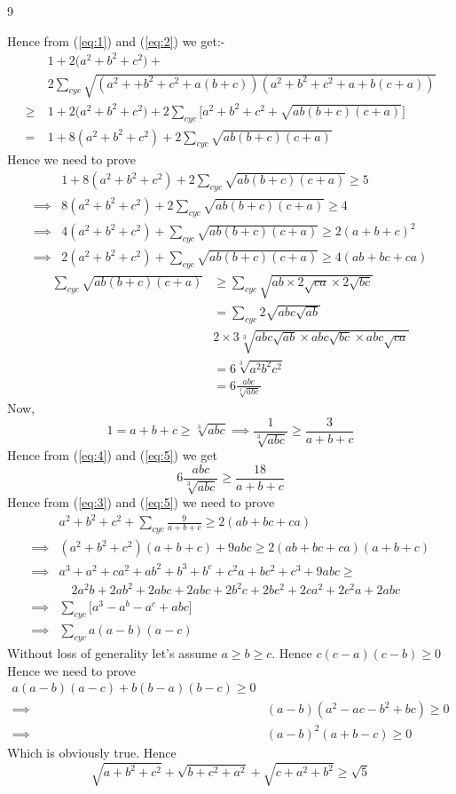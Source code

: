 9\documentclass[12pt]{article}
\begin{document}
{Hence from (\ref{eq:1}) and (\ref{eq:2}) we get:-
\begin{align*}
 & 1+2\Big(a^2+b^2+c^2\Big)+ \nonumber \\[2mm]
&   2\sum_{cyc}\sqrt{(a^2++b^2+c^2+a(b+c))(a^2+b^2+c^2+a+b(c+a))}\nonumber \\[2mm]
\geq & 1+2\Big(a^2+b^2+c^2\Big)+ 2\sum_{cyc}\Big[a^2+b^2+c^2+\sqrt{ab(b+c)(c+a)}\Big]\nonumber \\[2mm]
=\ & 1+8(a^2+b^2+c^2)+2\sum_{cyc}\sqrt{ab(b+c)(c+a)}
\end{align*}
Hence we need to prove \begin{align}
& 1+8(a^2+b^2+c^2)+2\sum_{cyc}\sqrt{ab(b+c)(c+a)}\geq 5\nonumber \\
\implies & 8(a^2+b^2+c^2)+2\sum_{cyc}\sqrt{ab(b+c)(c+a)}\geq 4\nonumber \\
\implies & 4(a^2+b^2+c^2)+\sum_{cyc}\sqrt{ab(b+c)(c+a)}\geq 2(a+b+c)^2\nonumber \\
\implies & \label{eq:3}2(a^2+b^2+c^2)+\sum_{cyc}\sqrt{ab(b+c)(c+a)}\geq 4(ab+bc+ca)
\end{align}
}\begin{align}
\sum_{cyc}\sqrt{ab(b+c)(c+a)} & \geq \sum_{cyc}\sqrt{ab\times 2\sqrt{ca}\times 2\sqrt{bc}}\nonumber\\
& = \sum_{cyc}2\sqrt{abc\sqrt{ab}}\nonumber\\
& 2\times 3\sqrt[3]{abc\sqrt{ab}\times abc\sqrt{bc}\times abc\sqrt{ca}}\nonumber\\[5mm]
&= 6\sqrt[3]{a^2b^2c^2}\nonumber\\
\label{eq:4}&= 6\frac{abc}{\sqrt[3]{abc}}
\end{align}
Now,\begin{equation}
\label{eq:5}1=a+b+c\geq\sqrt[3]{abc}\implies \frac{1}{\sqrt[3]{abc}}\geq \frac{3}{a+b+c}
\end{equation}
Hence from (\ref{eq:4}) and (\ref{eq:5}) we get$$6\frac{abc}{\sqrt[3]{abc}}\geq \frac{18}{a+b+c}$$
Hence from (\ref{eq:3}) and (\ref{eq:5}) we need to prove\begin{align*}
& a^2+b^2+c^2+\sum_{cyc}\frac{9}{a+b+c}\geq 2(ab+bc+ca)\\
\implies & (a^2+b^2+c^2)(a+b+c) +9abc\geq  2(ab+bc+ca)(a+b+c)\\
\implies & a^3+a^2+ca^2+ab^2+b^3+b^c+c^2a+bc^2+c^3+9abc\geq \\
& \quad 2a^2b+2ab^2+2abc+2abc+2b^2c+2bc^2+2ca^2+2c^2a+2abc\\
\implies & \sum_{cyc}\Big[a^3-a^b-a^c+abc\Big]\\
\implies &  \sum_{cyc}a(a-b)(a-c)
\end{align*} 
Without loss of generality let's assume $a\geq b\geq c$. Hence $c(c-a)(c-b)\geq 0$Hence we need to prove\begin{align*}
a(a-b)(a-c)+b(b-a)(b-c)\geq 0\\
\implies & (a-b)(a^2-ac-b^2+bc)\geq 0\\
\implies &  (a-b)^2(a+b-c)\geq 0
\end{align*}
Which is obviously true. Hence $$\sqrt{a+b^2+c^2}+\sqrt{b+c^2+a^2}+\sqrt{c+a^2+b^2} \geq \sqrt{5}$$
\end{document}
